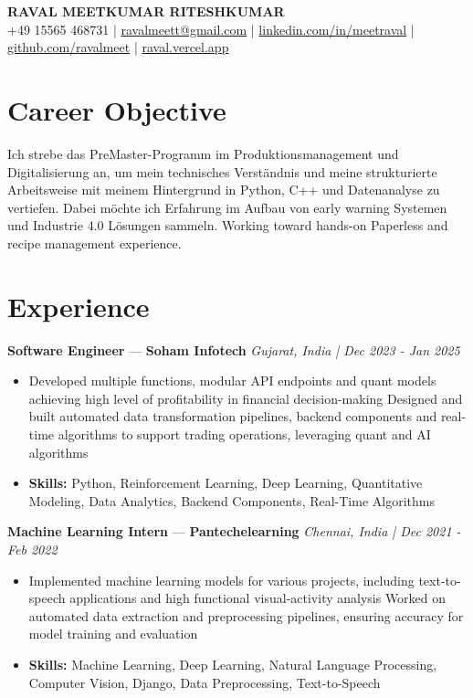 \documentclass[a4paper,10pt]{article}
\begin{document}
\begin{center}
  {\Large\bfseries RAVAL MEETKUMAR RITESHKUMAR}\\[2pt]
  {\small +49 15565 468731 \;|\; \href{mailto:ravalmeett@gmail.com}{ravalmeett@gmail.com} \;|\; \href{https://www.linkedin.com/in/meetraval/}{linkedin.com/in/meetraval} \;|\; \href{https://github.com/ravalmeet}{github.com/ravalmeet} \;|\; \href{https://raval.vercel.app/}{raval.vercel.app}}
\end{center}
\vspace{-3pt}

\section*{Career Objective}
Ich strebe das PreMaster-Programm im Produktionsmanagement und Digitalisierung an, um mein technisches Verständnis und meine strukturierte Arbeitsweise mit meinem Hintergrund in Python, C++ und Datenanalyse zu vertiefen. Dabei möchte ich Erfahrung im Aufbau von early warning Systemen und Industrie 4.0 Lösungen sammeln. Working toward hands-on Paperless and recipe management experience.\par

\section*{Experience}
\textbf{Software Engineer} — \textbf{Soham Infotech} \hfill \textit{Gujarat, India \;|\; Dec 2023 - Jan 2025}\par
\vspace{1pt}
\begin{itemize}
  \item Developed multiple functions, modular API endpoints and quant models achieving high level of profitability in financial decision-making Designed and built automated data transformation pipelines, backend components and real-time algorithms to support trading operations, leveraging quant and AI algorithms
  \item \textbf{Skills:} Python, Reinforcement Learning, Deep Learning, Quantitative Modeling, Data Analytics, Backend Components, Real-Time Algorithms
\end{itemize}
\vspace{3pt}
\textbf{Machine Learning Intern} — \textbf{Pantechelearning} \hfill \textit{Chennai, India \;|\; Dec 2021 - Feb 2022}\par
\vspace{1pt}
\begin{itemize}
  \item Implemented machine learning models for various projects, including text-to-speech applications and high functional visual-activity analysis Worked on automated data extraction and preprocessing pipelines, ensuring accuracy for model training and evaluation
  \item \textbf{Skills:} Machine Learning, Deep Learning, Natural Language Processing, Computer Vision, Django, Data Preprocessing, Text-to-Speech
\end{itemize}
\end{document}
